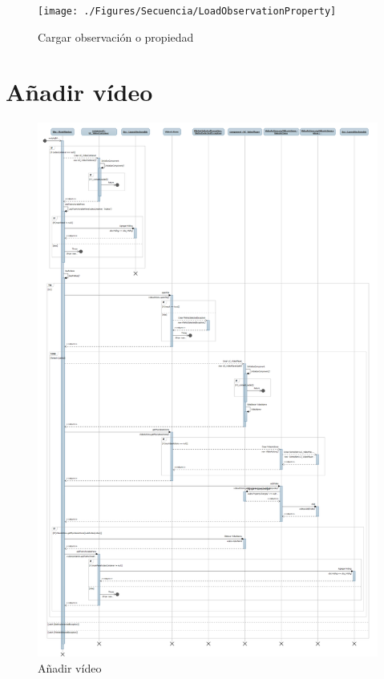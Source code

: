 \begin{figure}[H]
\centering
\texttt{[image: ./Figures/Secuencia/LoadObservationProperty]}
\caption{Cargar observaci\'on o propiedad}
\label{fig:LoadObservationProperty}
\end{figure}


\section{A\~nadir v\'ideo}
\begin{figure}[H]
\centering
\includegraphics[width=0.8\linewidth]{./Figures/Secuencia/AddVideo}
\caption{A\~nadir v\'ideo}
\label{fig:AddVideo}
\end{figure}

